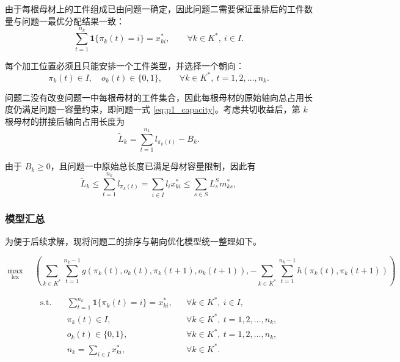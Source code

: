 \documentclass[UTF8]{ctexart}
\begin{document}
由于每根母材上的工件组成已由问题一确定，因此问题二需要保证重排后的工件数量与问题一最优分配结果一致：
\begin{equation}
\sum_{t=1}^{n_k}\mathbf{1}\{\pi_k(t)=i\}=x_{ki}^*,
\qquad \forall k\in K^*,\ i\in I.
\label{eq:p2_count_constraint}
\end{equation}

每个加工位置必须且只能安排一个工件类型，并选择一个朝向：
\begin{equation}
\pi_k(t)\in I,\quad o_k(t)\in\{0,1\},
\qquad \forall k\in K^*,\ t=1,2,\ldots,n_k.
\label{eq:p2_position_domain}
\end{equation}

问题二没有改变问题一中每根母材的工件集合，因此每根母材的原始轴向总占用长度仍满足问题一容量约束，即问题一式 \eqref{eq:p1_capacity}。考虑共切收益后，第 $k$ 根母材的拼接后轴向占用长度为
\begin{equation}
\widetilde{L}_k=
\sum_{t=1}^{n_k}l_{\pi_k(t)}-B_k.
\label{eq:p2_tilde_length}
\end{equation}

由于 $B_k\geq0$，且问题一中原始总长度已满足母材容量限制，因此有
\[
\widetilde{L}_k\leq \sum_{t=1}^{n_k}l_{\pi_k(t)}
=\sum_{i\in I}l_i x_{ki}^*
\leq \sum_{s\in S}L_s^S m_{ks}^*,
\]


\subsubsection{模型汇总}

为便于后续求解，现将问题二的排序与朝向优化模型统一整理如下。

\begin{equation}
\max_{\mathrm{lex}}\quad
\left(
\sum_{k\in K^*}\sum_{t=1}^{n_k-1}
g\left(\pi_k(t),o_k(t),\pi_k(t+1),o_k(t+1)\right),
-
\sum_{k\in K^*}\sum_{t=1}^{n_k-1}
h\left(\pi_k(t),\pi_k(t+1)\right)
\right)
\end{equation}

\begin{equation}
\begin{aligned}
\mathrm{s.t.}\quad
&\sum_{t=1}^{n_k}\mathbf{1}\{\pi_k(t)=i\}=x_{ki}^*,
&&\forall k\in K^*,\ i\in I,\\
&\pi_k(t)\in I,
&&\forall k\in K^*,\ t=1,2,\ldots,n_k,\\
&o_k(t)\in\{0,1\},
&&\forall k\in K^*,\ t=1,2,\ldots,n_k,\\
&n_k=\sum_{i\in I}x_{ki}^*,
&&\forall k\in K^*.
\end{aligned}
\end{equation}
\end{document}

